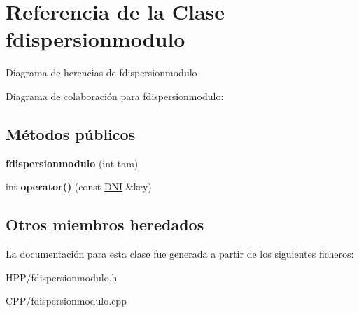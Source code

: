 \hypertarget{classfdispersionmodulo}{}\section{Referencia de la Clase fdispersionmodulo}
\label{classfdispersionmodulo}


Diagrama de herencias de fdispersionmodulo


Diagrama de colaboración para fdispersionmodulo\+:
\subsection*{Métodos públicos}
\begin{DoxyCompactItemize}
\item 
\mbox{\label{classfdispersionmodulo_a7a75cdfa15bf5c0de65071265fdf861d}} 
{\bfseries fdispersionmodulo} (int tam)
\item 
\mbox{\label{classfdispersionmodulo_a8b075cccb51ac46bf1ac9bab4c689bce}} 
int {\bfseries operator()} (const \hyperlink{classDNI}{D\+NI} \&key)
\end{DoxyCompactItemize}
\subsection*{Otros miembros heredados}


La documentación para esta clase fue generada a partir de los siguientes ficheros\+:\begin{DoxyCompactItemize}
\item 
H\+P\+P/fdispersionmodulo.\+h\item 
C\+P\+P/fdispersionmodulo.\+cpp\end{DoxyCompactItemize}
